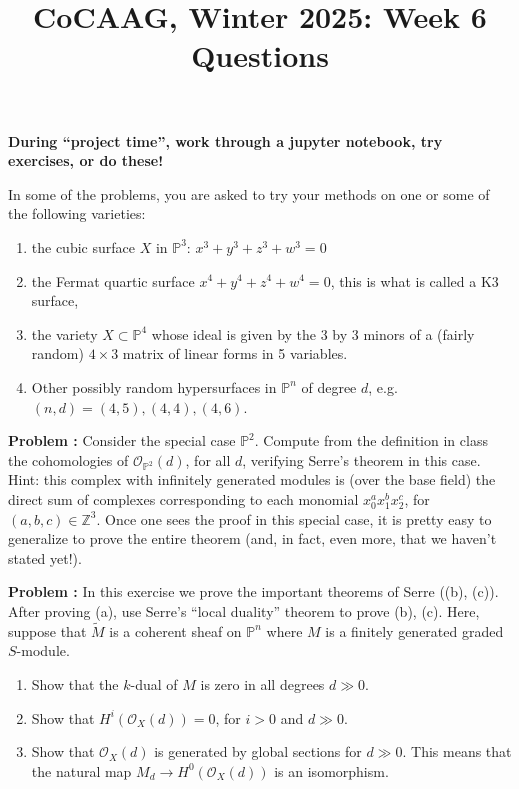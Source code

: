\documentclass[11pt]{amsart}
\numberwithin{equation}{section}
\newcommand{\bnum}{\begin{enumerate}} %
\newcommand{\babc}{\bnum\renewcommand{\labelenumi}{(\alph{enumi})}}%
\newcommand{\eabc}{\end{enumerate}}
\newcommand{\PP}{\mathbb P}
\newcommand{\ZZ}{\mathbb Z}
\newcommand{\OO}{\mathcal O}
\theoremstyle{definition}
\theoremstyle{remark}
\newcounter{excount}
\newcommand\exercise[1]{\addtocounter{excount}{1}\noindent\textbf{Problem \arabic{excount}: }#1{$ $}\\}
\begin{document}
\setcounter{excount}{0}

\title{CoCAAG, Winter 2025: Week 6 Questions}
\maketitle
\vspace{0.5cm}
\noindent \textbf{During ``project time'',
  work through a jupyter notebook, try exercises, or do these!}

\medskip

In some of the problems, you are asked to try your methods on one or some of the following varieties:
\babc
\item the cubic surface $X$ in $\PP^3$: $x^3+y^3+z^3+w^3 = 0$
\item the Fermat quartic surface   $x^4+y^4+z^4+w^4=0$, this is what is called a K3 surface,
\item the variety $X \subset \PP^4$ whose ideal is given by the 3 by 3 minors of a
  (fairly random) $4 \times 3$ matrix of linear forms in 5 variables.
\item Other possibly random hypersurfaces in $\PP^n$ of degree $d$, e.g. $(n,d) = (4,5), (4,4), (4,6)$.
  \eabc
  
\bigskip

\exercise{
  Consider the special case $\PP^2$.  Compute from the definition in class the cohomologies of $\OO_{\PP^2}(d)$, for all $d$,
  verifying Serre's theorem in this case.  Hint: this complex with infinitely generated modules is (over the base field)
  the direct sum of complexes corresponding to each monomial $x_0^a x_1^b x_2^c$, for $(a,b,c) \in \ZZ^3$.
  Once one sees the proof in this special case, it is pretty easy to generalize to prove the entire theorem (and, in fact,
  even more, that we haven't stated yet!).
}

\exercise{
  In this exercise we prove the important theorems of Serre ((b), (c)).
  After proving (a),
  use Serre's ``local duality'' theorem to prove (b), (c).
  Here, suppose that $\widetilde{M}$ is
  a coherent sheaf on $\PP^n$ where $M$ is a finitely generated graded
  $S$-module.
  \babc
\item Show that the $k$-dual of $M$ is zero in all degrees $d \gg 0$.
\item Show that $H^i(\OO_X(d)) = 0$, for $i > 0$ and $d \gg 0$.
\item Show that $\OO_X(d)$ is generated by global sections for $d \gg 0$.  This means that the
  natural map $M_d \to H^0(\OO_X(d))$ is an isomorphism.
  \eabc
}
\end{document}
